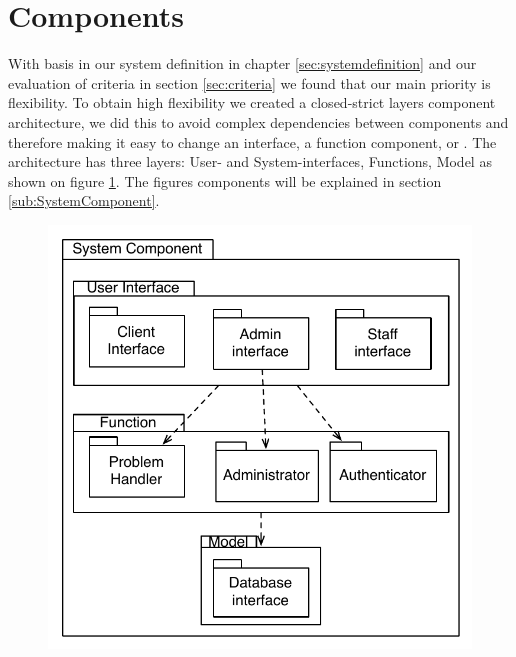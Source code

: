 \section{Components}
\label{sec:components}
With basis in our system definition in chapter \ref{sec:systemdefinition} and our evaluation of criteria in section \ref{sec:criteria} we found that our main priority is flexibility. To obtain high flexibility we created a closed-strict layers component architecture, we did this to avoid complex dependencies between components and therefore making it easy to change an interface, a function component, or . 
The architecture has three layers: User- and System-interfaces, Functions, Model as shown on figure \ref{fig:SystemComponent}. The figures components will be explained in section \ref{sub:SystemComponent}.

\begin{figure}[]
	\centering
		\includegraphics[scale=0.5]{input/architectural_design/system_component_denvibruger.pdf}
	\label{fig:SystemComponent}
\end{figure}


